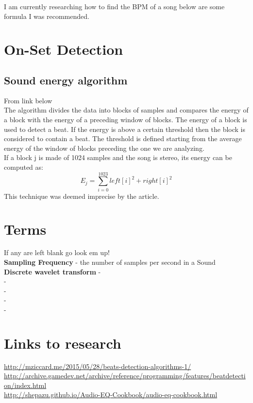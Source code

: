 \documentclass[a4paper]{article}
\begin{document}
    I am currently researching how to find the BPM of a song below are some formula I was recommended.
    \section{On-Set Detection}
        \subsection{Sound energy algorithm}
            From link below \\
            The algorithm divides the data into blocks of samples and compares the energy of a block
            with the energy of a preceding window of blocks. The energy of a block is used to detect a beat. If the
            energy is above a certain threshold then the block is considered to contain a beat. The threshold is defined
            starting from the average energy of the window of blocks preceding the one we are analyzing.\\
            If a block j is made of 1024 samples and the song is stereo, its energy can be computed as:
            \[E_j = \sum_{i=0}^{1023}left[i]^2 + right[i]^2  \]
            This technique was deemed imprecise by the article.


    \section{Terms}
        If any are left blank go look em up!\\
         \textbf{Sampling Frequency} - the number of samples per second in a Sound \\
         \textbf{Discrete wavelet transform} - \\
         \textbf{} - \\
         \textbf{} - \\
         \textbf{} - \\
         \textbf{} - \\

    \section{Links to research}
        \url{http://mziccard.me/2015/05/28/beats-detection-algorithms-1/}\\
        \url{http://archive.gamedev.net/archive/reference/programming/features/beatdetection/index.html}\\
        \url{http://shepazu.github.io/Audio-EQ-Cookbook/audio-eq-cookbook.html}\\
        \url{}\\
        \url{}\\
        \url{}\\
\end{document}

